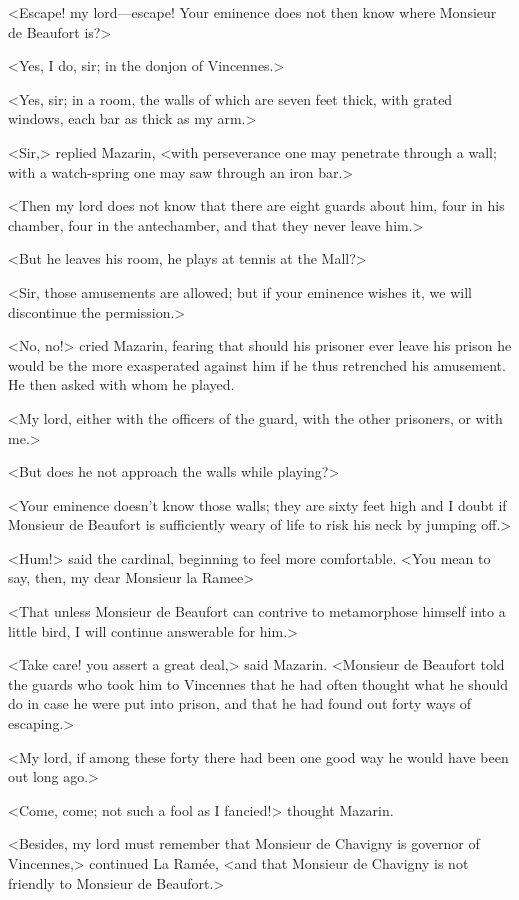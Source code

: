 <Escape! my lord—escape! Your eminence does not then know where Monsieur de Beaufort is?>

<Yes, I do, sir; in the donjon of Vincennes.>

<Yes, sir; in a room, the walls of which are seven feet thick, with grated windows, each bar as thick as my arm.>

<Sir,> replied Mazarin, <with perseverance one may penetrate through a wall; with a watch-spring one may saw through an iron bar.>

<Then my lord does not know that there are eight guards about him, four in his chamber, four in the antechamber, and that they never leave him.>

<But he leaves his room, he plays at tennis at the Mall?>

<Sir, those amusements are allowed; but if your eminence wishes it, we will discontinue the permission.>

<No, no!> cried Mazarin, fearing that should his prisoner ever leave his prison he would be the more exasperated against him if he thus retrenched his amusement. He then asked with whom he played.

<My lord, either with the officers of the guard, with the other prisoners, or with me.>

<But does he not approach the walls while playing?>

<Your eminence doesn't know those walls; they are sixty feet high and I doubt if Monsieur de Beaufort is sufficiently weary of life to risk his neck by jumping off.>

<Hum!> said the cardinal, beginning to feel more comfortable. <You mean to say, then, my dear Monsieur la Ramee\longdash>

<That unless Monsieur de Beaufort can contrive to metamorphose himself into a little bird, I will continue answerable for him.>

<Take care! you assert a great deal,> said Mazarin. <Monsieur de Beaufort told the guards who took him to Vincennes that he had often thought what he should do in case he were put into prison, and that he had found out forty ways of escaping.>

<My lord, if among these forty there had been one good way he would have been out long ago.>

<Come, come; not such a fool as I fancied!> thought Mazarin.

<Besides, my lord must remember that Monsieur de Chavigny is governor of Vincennes,> continued La Ramée, <and that Monsieur de Chavigny is not friendly to Monsieur de Beaufort.>

